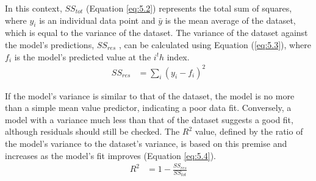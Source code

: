 
\noindent In this context, $SS_{tot}$ (Equation \ref{eq:5.2}) represents the total sum of squares, where $y_i$ is an individual data point and $\bar y$  is the mean average of the dataset, which is equal to the variance of the dataset. The variance of the dataset against the model's predictions, $SS_{res}$ , can be calculated using Equation (\ref{eq:5.3}), where $f_i$  is the model's predicted value at the $i^th$ index.
\begin{align}
    SS_{res} &= \sum_{i}\left( y_i - f_i \right)^2 \label{eq:5.3} 
\end{align}


\noindent If the model's variance is similar to that of the dataset, the model is no more than a simple mean value predictor, indicating a poor data fit. Conversely, a model with a variance much less than that of the dataset suggests a good fit, although residuals should still be checked. The $R^2$ value, defined by the ratio of the model's variance to the dataset's variance, is based on this premise and increases as the model's fit improves (Equation \ref{eq:5.4}).
\begin{align}
    R^2 &= 1 - \frac{SS_{res}}{SS_{tot}} \label{eq:5.4} 
\end{align}


